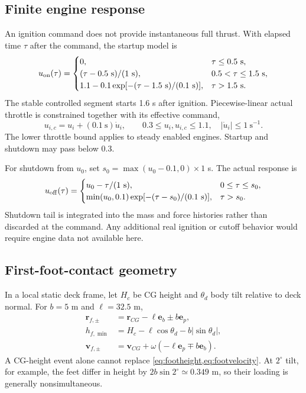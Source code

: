\documentclass[11pt,a4paper]{article}
\newcommand{\vect}[1]{\bm{#1}}
\newcommand{\eb}{\vect e_b}
\newcommand{\ep}{\vect e_p}
\begin{document}
\subsection{Finite engine response}
An ignition command does not provide instantaneous full thrust. With elapsed time $\tau$ after the command, the startup model is
\begin{equation}
 u_{\rm on}(\tau)=
 \begin{cases}
 0,&\tau\le0.5\ \mathrm{s},\\
 (\tau-0.5\ \mathrm{s})/(1\ \mathrm{s}),&0.5<\tau\le1.5\ \mathrm{s},\\
 1.1-0.1\exp[-(\tau-1.5\ \mathrm{s})/(0.1\ \mathrm{s})],&\tau>1.5\ \mathrm{s}.
 \end{cases}
\label{eq:startup}
\end{equation}
The stable controlled segment starts 1.6 s after ignition. Piecewise-linear actual throttle is constrained together with its effective command,
\begin{equation}
 u_{i,c}=u_i+(0.1\ \mathrm{s})\dot u_i,\qquad
 0.3\le u_i,u_{i,c}\le1.1,\quad |\dot u_i|\le1\ \mathrm{s}^{-1}.
\label{eq:actuator}
\end{equation}
The lower throttle bound applies to steady enabled engines. Startup and shutdown may pass below 0.3.

For shutdown from $u_0$, set $s_0=\max(u_0-0.1,0)\times1$ s. The actual response is
\begin{equation}
 u_{\rm off}(\tau)=\begin{cases}
 u_0-\tau/(1\ \mathrm{s}),&0\le\tau\le s_0,\\
 \min(u_0,0.1)\exp[-(\tau-s_0)/(0.1\ \mathrm{s})],&\tau>s_0.
 \end{cases}
\end{equation}
Shutdown tail is integrated into the mass and force histories rather than discarded at the command. Any additional real ignition or cutoff behavior would require engine data not available here.

\subsection{First-foot-contact geometry}
In a local static deck frame, let $H_c$ be CG height and $\theta_d$ body tilt relative to deck normal. For $b=5$ m and $\ell=32.5$ m,
\begin{align}
 \vect r_{f,\pm}&=\vect r_{CG}-\ell\eb\pm b\ep,\\
 h_{f,\min}&=H_c-\ell\cos\theta_d-b|\sin\theta_d|,
\label{eq:footheight}\\
 \vect v_{f,\pm}&=\vect v_{CG}+\omega(-\ell\ep\mp b\eb).
\label{eq:footvelocity}
\end{align}
A CG-height event alone cannot replace \cref{eq:footheight,eq:footvelocity}. At $2^\circ$ tilt, for example, the feet differ in height by $2b\sin2^\circ\simeq0.349$ m, so their loading is generally nonsimultaneous.
\end{document}
